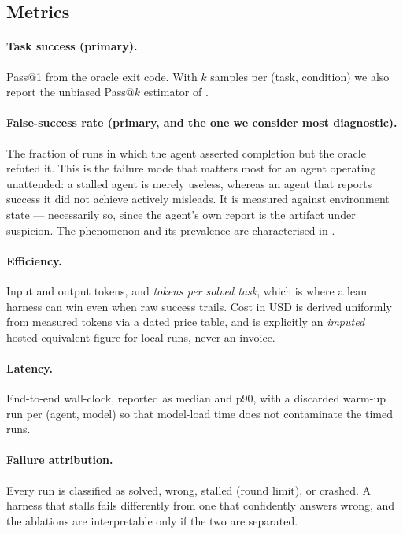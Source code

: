 \documentclass[11pt,a4paper]{article}
\begin{document}
\subsection{Metrics}
\label{sec:metrics}

\paragraph{Task success (primary).} Pass@1 from the oracle exit code. With $k$
samples per (task, condition) we also report the unbiased Pass@$k$ estimator of
\citet{chen2021codex}.

\paragraph{False-success rate (primary, and the one we consider most
diagnostic).} The fraction of runs in which the agent asserted completion but the
oracle refuted it. This is the failure mode that matters most for an agent
operating unattended: a stalled agent is merely useless, whereas an agent that
reports success it did not achieve actively misleads. It is measured against
environment state --- necessarily so, since the agent's own report is the
artifact under suspicion. The phenomenon and its prevalence are characterised in
\citep{advani2026falsesuccess,cao2026corruptsuccess}.

\paragraph{Efficiency.} Input and output tokens, and \emph{tokens per solved
task}, which is where a lean harness can win even when raw success trails. Cost
in USD is derived uniformly from measured tokens via a dated price table, and is
explicitly an \emph{imputed} hosted-equivalent figure for local runs, never an
invoice.

\paragraph{Latency.} End-to-end wall-clock, reported as median and p90, with a
discarded warm-up run per (agent, model) so that model-load time does not
contaminate the timed runs.

\paragraph{Failure attribution.} Every run is classified as solved, wrong,
stalled (round limit), or crashed. A harness that stalls fails differently from
one that confidently answers wrong, and the ablations are interpretable only if
the two are separated.
\end{document}
